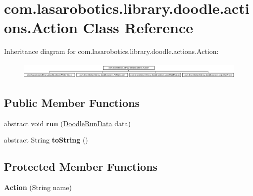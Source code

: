 \hypertarget{classcom_1_1lasarobotics_1_1library_1_1doodle_1_1actions_1_1_action}{}\section{com.\+lasarobotics.\+library.\+doodle.\+actions.\+Action Class Reference}
\label{classcom_1_1lasarobotics_1_1library_1_1doodle_1_1actions_1_1_action}
Inheritance diagram for com.\+lasarobotics.\+library.\+doodle.\+actions.\+Action\+:\begin{figure}[H]
\begin{center}
\leavevmode
\includegraphics[height=0.818713cm]{classcom_1_1lasarobotics_1_1library_1_1doodle_1_1actions_1_1_action}
\end{center}
\end{figure}
\subsection*{Public Member Functions}
\begin{DoxyCompactItemize}
\item 
\hypertarget{classcom_1_1lasarobotics_1_1library_1_1doodle_1_1actions_1_1_action_a29325ad8bfd4c26adaebb485f22db577}{}abstract void {\bfseries run} (\hyperlink{classcom_1_1lasarobotics_1_1library_1_1doodle_1_1_doodle_run_data}{Doodle\+Run\+Data} data)\label{classcom_1_1lasarobotics_1_1library_1_1doodle_1_1actions_1_1_action_a29325ad8bfd4c26adaebb485f22db577}

\item 
\hypertarget{classcom_1_1lasarobotics_1_1library_1_1doodle_1_1actions_1_1_action_a2310b2bb2e4557f7e7d2a7d92fd563c3}{}abstract String {\bfseries to\+String} ()\label{classcom_1_1lasarobotics_1_1library_1_1doodle_1_1actions_1_1_action_a2310b2bb2e4557f7e7d2a7d92fd563c3}

\end{DoxyCompactItemize}
\subsection*{Protected Member Functions}
\begin{DoxyCompactItemize}
\item 
\hypertarget{classcom_1_1lasarobotics_1_1library_1_1doodle_1_1actions_1_1_action_a8973bac07f54daedf9229a8d43dde042}{}{\bfseries Action} (String name)\label{classcom_1_1lasarobotics_1_1library_1_1doodle_1_1actions_1_1_action_a8973bac07f54daedf9229a8d43dde042}

\end{DoxyCompactItemize}


